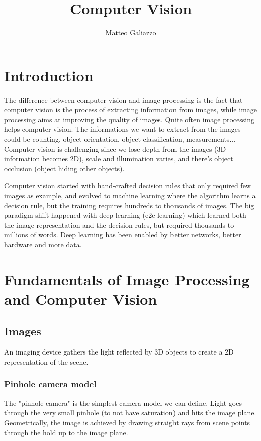 \documentclass{article}
\title{Computer Vision}
\author{Matteo Galiazzo}
\begin{document}
\maketitle

\tableofcontents


\section{Introduction}

The difference between computer vision and image processing is the fact that computer vision is the process of extracting information from images, while image processing aims at improving the quality of images.
Quite often image processing helps computer vision.
The informations we want to extract from the images could be counting, object orientation, object classification, measurements...
Computer vision is challenging since we lose depth from the images (3D information becomes 2D), scale and illumination varies, and there's object occlusion (object hiding other objects).

Computer vision started with hand-crafted decision rules that only required few images as example, and evolved to machine learning where the algorithm learns a decision rule, but the training requires hundreds to thousands of images.
The big paradigm shift happened with deep learning (e2e learning) which learned both the image representation and the decision rules, but required thousands to millions of words.
Deep learning has been enabled by better networks, better hardware and more data.


\section{Fundamentals of Image Processing and Computer Vision}

\subsection{Images}

An imaging device gathers the light reflected by 3D objects to create a 2D representation of the scene.

\subsubsection{Pinhole camera model}
The "pinhole camera" is the simplest camera model we can define.
Light goes through the very small pinhole (to not have saturation) and hits the image plane.
Geometrically, the image is achieved by drawing straight rays from scene points through the hold up to the image plane.
\end{document}
